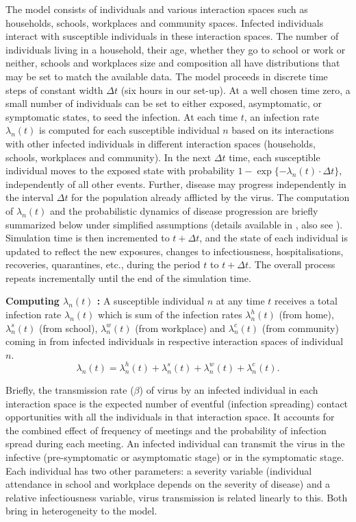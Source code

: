 \documentclass{article}
\theoremstyle{definition}
\begin{document}
The model consists of individuals and various interaction spaces such as households, schools, workplaces and community spaces.
 Infected individuals interact with susceptible individuals in these interaction spaces. The number of individuals living in a household, their age, whether they go to school or work or neither, schools and workplaces  size and  composition all have distributions that may be set to match the available data. The model proceeds in discrete time steps of constant width $\Delta t$ (six hours in our set-up). At a well chosen time zero, a small number of individuals can be set to either exposed, asymptomatic, or symptomatic states, to seed the infection. At each time $t$, an infection rate $\lambda_n(t)$ is computed for each susceptible individual $n$ based on its interactions with other infected individuals in different interaction spaces (households, schools, workplaces and  community).  In the next $\Delta t$ time, each susceptible individual moves to the exposed state with probability $1 - \exp\{ - \lambda_n(t) \cdot \Delta t\}$, independently of all other events. Further, disease may progress independently in the interval $\Delta t$ for the population already afflicted by the virus. The computation of $\lambda_n(t)$ and the probabilistic dynamics of disease progression are briefly summarized below under simplified assumptions (details available in \cite{City_Simulator_IISc_TIFR_2020}, also see \cite{ferguson2020report}). Simulation time is then incremented to $t + \Delta t$, and the state of each individual is updated to  reflect the new exposures, changes to infectiousness, hospitalisations, recoveries, quarantines, etc., during the period $t$ to $t + \Delta t$.  The overall process repeats incrementally until the end of the simulation time. 


\noindent \textbf{Computing $\lambda_n(t)$ :} A susceptible individual $n$ at any time $t$ receives a total infection rate $\lambda_n(t)$ which is sum of the infection rates $\lambda_n^{h}(t)$ (from home), $\lambda_n^{s}(t)$ (from school), $\lambda_n^{w}(t)$ 
(from workplace) and  $\lambda_n^{c}(t)$  (from community)
 coming in from infected individuals in respective interaction spaces of individual $n$. 
\[\lambda_n(t)= \lambda_n^{h}(t)+\lambda_n^{s}(t)+\lambda_n^{w}(t)+\lambda_n^{c}(t).\]

Briefly, the transmission rate ($\beta$) of virus by an infected individual in each interaction space is the expected number of eventful (infection spreading) contact opportunities with all the individuals in that interaction space. It accounts for the combined effect of frequency of meetings and the probability of infection spread during each meeting. 
 An infected individual can transmit the virus in the infective (pre-symptomatic or asymptomatic stage) or in the symptomatic stage. Each individual has two other parameters: a severity variable (individual attendance in school and workplace depends on the severity of disease) and a relative infectiousness variable, virus transmission is related linearly to this. Both bring in heterogeneity to the model. 
 
\end{document}
